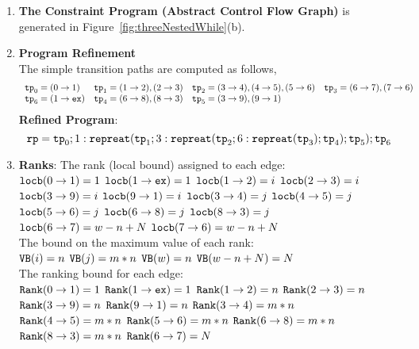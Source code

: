 \begin{enumerate}
  \item  \textbf{The Constraint Program (Abstract Control Flow Graph)} is generated in Figure~\ref{fig:threeNestedWhile}(b).

  \item \textbf{Program Refinement}
  \\
  The simple transition paths are computed as follows,
  \[
      \begin{array}{llll}
          \mathtt{tp}_0 = (0 \to 1)
          &
          \mathtt{tp}_1 = (1 \to 2), (2 \to 3)
          &           
          \mathtt{tp}_2 = (3 \to 4), (4 \to 5), (5 \to 6)
          &
          \mathtt{tp}_3 = (6 \to 7), (7 \to 6)
          \\
          \mathtt{tp}_6 = (1 \to \mathtt{ex})
          &
          \mathtt{tp}_4 = (6 \to 8), (8 \to 3)
          &
          \mathtt{tp}_5 = (3 \to 9), (9 \to 1)
      \end{array}
      \]
  \textbf{Refined Program}:
  \[
  \mathtt{rp} = \mathtt{tp}_0 ; 1: \mathtt{repreat}(\mathtt{tp}_1; 3: \mathtt{repreat}(\mathtt{tp}_2; 6 : \mathtt{repreat}(\mathtt{tp}_3); \mathtt{tp}_4); \mathtt{tp}_5); \mathtt{tp}_6
  \]
  \item \textbf{Ranks}:
    The rank (local bound) assigned to each edge:
      \\  
      $\mathtt{locb}(0 \to 1) = 1$ 
      \quad $\mathtt{locb}(1 \to \mathtt{ex}) = 1$
      \quad $\mathtt{locb}(1 \to 2) = i$
      \quad $\mathtt{locb}(2 \to 3) = i$ 
      \quad $\mathtt{locb}(3 \to 9) = i$ 
      \quad $\mathtt{locb}(9 \to 1) = i$ 
      \quad $\mathtt{locb}(3 \to 4) = j$
      \quad $\mathtt{locb}(4 \to 5) = j$ 
      \quad $\mathtt{locb}(5 \to 6) = j$ 
      \quad $\mathtt{locb}(6 \to 8) = j$ 
      \quad $\mathtt{locb}(8 \to 3) = j$ 
      \quad $\mathtt{locb}(6 \to 7) = w - n + N$ 
      \quad $\mathtt{locb}(7 \to 6) = w - n + N$ 
  \\
  The bound on the maximum value of each rank:
  \\
  ${\mathtt{VB}}(i) = n$  \quad
  ${\mathtt{VB}}(j) = m * n$  \quad
  ${\mathtt{VB}}(w) = n$  \quad
  ${\mathtt{VB}}(w - n + N) = N$ 
  \\
  The ranking bound for each edge:
  \\
  ${\mathtt{Rank}}(0 \to 1) = 1$ 
  \quad ${\mathtt{Rank}}(1 \to \mathtt{ex}) = 1$
  \quad ${\mathtt{Rank}}(1 \to 2) = n$
  \quad ${\mathtt{Rank}}(2 \to 3) = n$ 
  \quad ${\mathtt{Rank}}(3 \to 9) = n$ 
  \quad ${\mathtt{Rank}}(9 \to 1) = n$ 
  \quad ${\mathtt{Rank}}(3 \to 4) = m * n$
  \quad ${\mathtt{Rank}}(4 \to 5) = m * n$ 
  \quad ${\mathtt{Rank}}(5 \to 6) = m * n$ 
  \quad ${\mathtt{Rank}}(6 \to 8) = m * n$ 
  \quad ${\mathtt{Rank}}(8 \to 3) = m * n$ 
  \quad ${\mathtt{Rank}}(6 \to 7) = N$ 

\end{enumerate}

